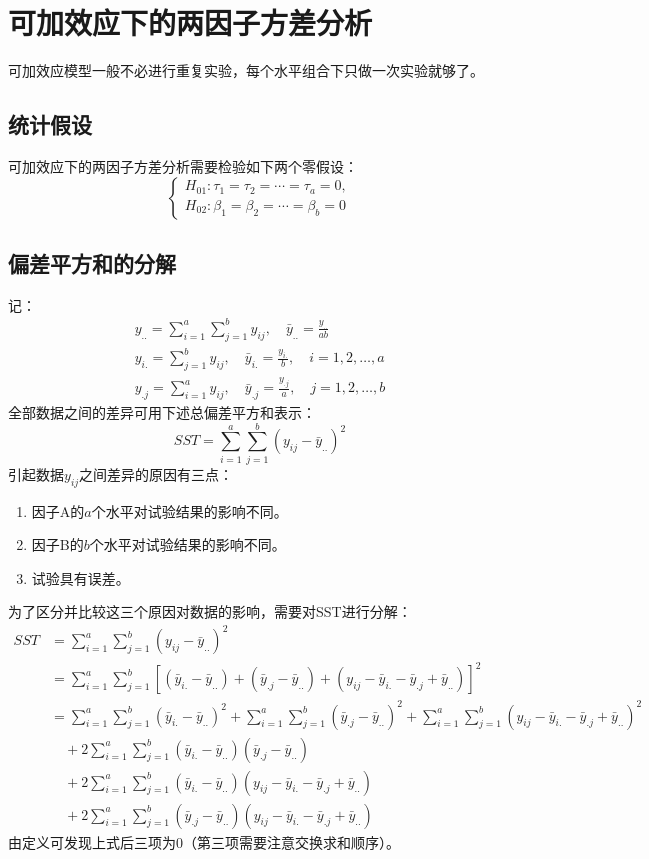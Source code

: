 \section{可加效应下的两因子方差分析}
可加效应模型一般不必进行重复实验，每个水平组合下只做一次实验就够了。


\subsection{统计假设}
可加效应下的两因子方差分析需要检验如下两个零假设：
\begin{equation*}
	\begin{cases}
		H_{01}:\tau_1=\tau_2=\cdots=\tau_a=0, \\
		H_{02}:\beta_1=\beta_2=\cdots=\beta_b=0
	\end{cases}
\end{equation*}

\subsection{偏差平方和的分解}
记：
\begin{gather*}
	y_{..}=\sum_{i=1}^a\sum_{j=1}^by_{ij},\quad
	\bar{y}_{..}=\frac{y_{..}}{ab} \\
	y_{i.}=\sum_{j=1}^by_{ij},\quad
	\bar{y}_{i.}=\frac{y_{i.}}{b},\quad i=1,2,\dots,a \\
	y_{.j}=\sum_{i=1}^ay_{ij},\quad
	\bar{y}_{.j}=\frac{y_{.j}}{a},\quad j=1,2,\dots,b 
\end{gather*}
全部数据之间的差异可用下述总偏差平方和表示：
\begin{equation*}
	SST=\sum_{i=1}^a\sum_{j=1}^b(y_{ij}-\bar{y}_{..})^2
\end{equation*}
引起数据$y_{ij}$之间差异的原因有三点：
\begin{enumerate}
	\item 因子A的$a$个水平对试验结果的影响不同。
	\item 因子B的$b$个水平对试验结果的影响不同。
	\item 试验具有误差。
\end{enumerate}
为了区分并比较这三个原因对数据的影响，需要对SST进行分解：
\begin{align*}
	SST
	&=\sum_{i=1}^a\sum_{j=1}^b(y_{ij}-\bar{y}_{..})^2 \\
	&=\sum_{i=1}^a\sum_{j=1}^b\left[(\bar{y}_{i.}-\bar{y}_{..})+(\bar{y}_{.j}-\bar{y}_{..})+(y_{ij}-\bar{y}_{i.}-\bar{y}_{.j}+\bar{y}_{..})\right]^2 \\
	&=\sum_{i=1}^a\sum_{j=1}^b(\bar{y}_{i.}-\bar{y}_{..})^2+\sum_{i=1}^a\sum_{j=1}^b(\bar{y}_{.j}-\bar{y}_{..})^2+\sum_{i=1}^a\sum_{j=1}^b(y_{ij}-\bar{y}_{i.}-\bar{y}_{.j}+\bar{y}_{..})^2 \\
	&\quad+2\sum_{i=1}^a\sum_{j=1}^b(\bar{y}_{i.}-\bar{y}_{..})(\bar{y}_{.j}-\bar{y}_{..}) \\
	&\quad+2\sum_{i=1}^a\sum_{j=1}^b(\bar{y}_{i.}-\bar{y}_{..})(y_{ij}-\bar{y}_{i.}-\bar{y}_{.j}+\bar{y}_{..}) \\
	&\quad+2\sum_{i=1}^a\sum_{j=1}^b(\bar{y}_{.j}-\bar{y}_{..})(y_{ij}-\bar{y}_{i.}-\bar{y}_{.j}+\bar{y}_{..})
\end{align*}
由定义可发现上式后三项为$0$（第三项需要注意交换求和顺序）。
